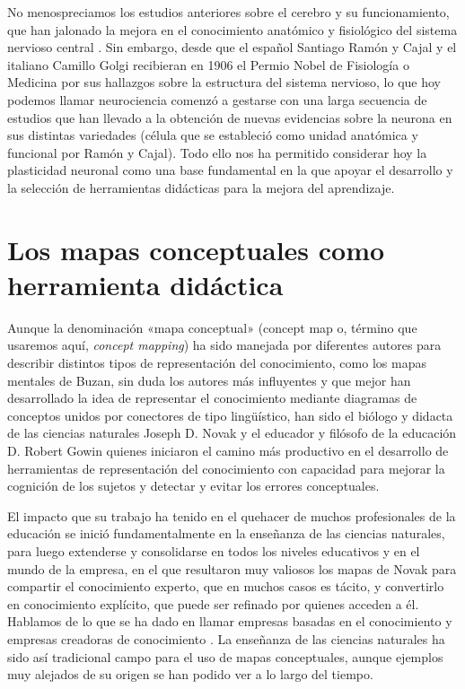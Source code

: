\documentclass[spanish]{textolivre}
\begin{document}
No menospreciamos los estudios anteriores sobre el cerebro y su funcionamiento, que han jalonado la mejora en el conocimiento anatómico y fisiológico del sistema nervioso central \cite{sanchez_blanco_2016}. %
Sin embargo, desde que el español Santiago Ramón y Cajal y el italiano Camillo Golgi recibieran en 1906 el Permio Nobel de Fisiología o Medicina por sus hallazgos sobre la estructura del sistema nervioso, lo que hoy podemos llamar neurociencia comenzó a gestarse con una larga secuencia de estudios que han llevado a la obtención de nuevas evidencias sobre la neurona en sus distintas variedades (célula que se estableció como unidad anatómica y funcional por Ramón y Cajal). Todo ello nos ha permitido considerar hoy la plasticidad neuronal como una base fundamental en la que apoyar el desarrollo y la selección de herramientas didácticas para la mejora del aprendizaje.


\section{Los mapas conceptuales como herramienta didáctica}\label{sec-mapas}

Aunque la denominación «mapa conceptual» (concept map o, término que usaremos aquí, \textit{concept mapping}) ha sido manejada por diferentes autores para describir distintos tipos de representación del conocimiento, como los mapas mentales de Buzan, sin duda los autores más influyentes y que mejor han desarrollado la idea de representar el conocimiento mediante diagramas de conceptos unidos por conectores de tipo lingüístico, han sido el biólogo y didacta de las ciencias naturales Joseph D. Novak y el educador y filósofo de la educación D. Robert Gowin \cite{canas2018mapas,novak1984learning} %
quienes iniciaron el camino más productivo en el desarrollo de herramientas de representación del conocimiento con capacidad para mejorar la cognición de los sujetos y detectar y evitar los errores conceptuales.

El impacto que su trabajo ha tenido en el quehacer de muchos profesionales de la educación se inició fundamentalmente en la enseñanza de las ciencias naturales, para luego extenderse y consolidarse en todos los niveles educativos y en el mundo de la empresa, en el que resultaron muy valiosos los mapas de Novak para compartir el conocimiento experto, que en muchos casos es tácito, y convertirlo en conocimiento explícito, que puede ser refinado por quienes acceden a él. Hablamos de lo que se ha dado en llamar empresas basadas en el conocimiento y empresas creadoras de conocimiento \cite{nonaka2009knowledge,nonaka2007knowledge}. %
La enseñanza de las ciencias naturales ha sido así tradicional campo para el uso de mapas conceptuales, aunque ejemplos muy alejados de su origen se han podido ver a lo largo del tiempo.
\end{document}
